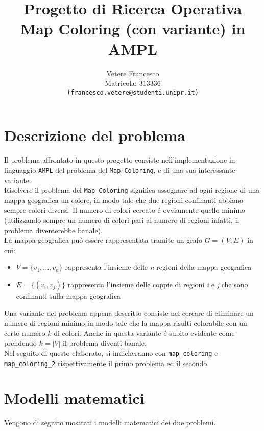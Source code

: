 \documentclass{article}
\title{\textbf{Progetto di Ricerca Operativa} \\
	\large \textbf{Map Coloring (con variante) in AMPL} \\
}
\author{Vetere Francesco\\ Matricola: 313336 \\ \texttt{(francesco.vetere@studenti.unipr.it)}}
\date{}
\begin{document}
\maketitle
\tableofcontents

\pagebreak

\section{Descrizione del problema} 

Il problema affrontato in questo progetto consiste nell'implementazione in linguaggio \texttt{AMPL} del problema del \texttt{Map Coloring}, e di una sua interessante variante.\\
Risolvere il problema del \texttt{Map Coloring} significa assegnare ad ogni regione di una mappa geografica un colore, in modo tale che due regioni confinanti abbiano sempre colori diversi. Il numero di colori cercato \'e ovviamente quello minimo (utilizzando sempre un numero di colori pari al numero di regioni infatti, il problema diventerebbe banale).\\
La mappa geografica pu\'o essere rappresentata tramite un grafo $G = (V, E)$ in cui:
\begin{itemize}
\item $V=\{v_{1},...,v_{n}\}$ rappresenta l'insieme delle \emph{n} regioni della mappa geografica
\item $E=\{(v_{i}, v_{j})\}$ rappresenta l'insieme delle coppie di regioni \emph{i} e \emph{j} che sono confinanti sulla mappa geografica\\
\end{itemize}

Una variante del problema appena descritto consiste nel cercare di eliminare un numero di regioni minimo in modo tale che la mappa risulti colorabile con un certo numero $k$ di colori. Anche in questa variante \'e subito evidente come prendendo $k = |V|$ il problema diventi banale.\\

Nel seguito di questo elaborato, si indicheranno con \texttt{map\_coloring} e \texttt{map\_coloring\_2} rispettivamente il primo problema ed il secondo.
\pagebreak

\section{Modelli matematici}
Vengono di seguito mostrati i modelli matematici dei due problemi.\\
\end{document}
